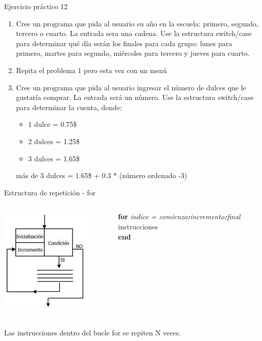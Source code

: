 \documentclass{bredelebeamer}
\begin{document}
\begin{frame}{Ejercicio práctico 12}
\begin{enumerate}
\item Cree un programa que pida al usuario su año en la escuela: primero, segundo, tercero o cuarto. La entrada sera una cadena. Use la estructura switch/case para determinar qué día serán los finales para cada grupo: lunes para primero, martes para segundo, miércoles para tercero y jueves para cuarto.
\item Repita el problema 1 pero esta vez con un menú
\item Cree un programa que pida al usuario ingresar el número de dulces que le gustaría comprar. La entrada será un número. Use la estructura switch/case para determinar la cuenta, donde:
\begin{itemize}
\item 1 dulce = 0.75\$
\item 2 dulces = 1.25\$
\item 3 dulces = 1.65\$
\end{itemize}
más de 3 dulces = 1.65\$ + 0.3 * (número ordenado -3)
\end{enumerate}
\end{frame}

\begin{frame}{Estructura de repetición - for}
\begin{columns}
\begin{column}{0.5\textwidth}
\begin{center}
\includegraphics[scale=0.7]{images/pantalla8.png}
\end{center}
\end{column}
\begin{column}{0.5\textwidth}
\textbf{for} \textit{indice = comienzo\textbf{:}incremento\textbf{:}final}\\
   instrucciones\\
\textbf{end}
\end{column}
\end{columns}
\begin{center}
Las instrucciones dentro del bucle for se repiten N veces.
\end{center}
\end{frame}
\end{document}

